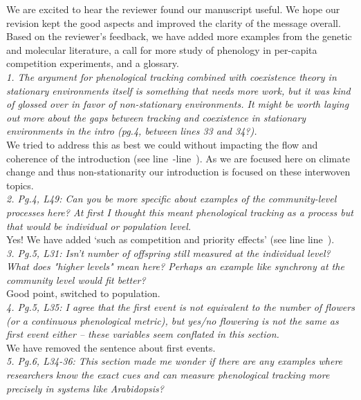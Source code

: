 \documentclass[11pt]{article}
\newcommand{\lr}[1]{line~\lineref{#1}}
\begin{document}
We are excited to hear the reviewer found our manuscript useful. We hope our revision kept the good aspects and improved the clarity of the message overall. Based on the reviewer's feedback, we have added more examples from the genetic and molecular literature, a call for more study of phenology in per-capita competition experiments, and a glossary.\\

\emph{1.      The argument for phenological tracking combined with coexistence theory in stationary
environments itself is something that needs more work, but it was kind of glossed over in
favor of non-stationary environments. It might be worth laying out more about the gaps
between tracking and coexistence in stationary environments in the intro (pg.4, between lines
33 and 34?).}\\

We tried to address this as best we could without impacting the flow and coherence of the introduction (see \lr{r2stat}-\lr{r2statend}). As we are focused here on climate change and thus non-stationarity our introduction is focused on these interwoven topics.\\

\emph{2.      Pg.4, L49: Can you be more specific about examples of the community-level processes
here? At first I thought this meant phenological tracking as a process but that would be
individual or population level.}\\

Yes! We have added `such as competition and priority effects' (see line \lr{r2example}).\\

\emph{3.      Pg.5, L31: Isn't number of offspring still measured at the individual level? What
does "higher levels" mean here? Perhaps an example like synchrony at the community level
would fit better?}\\

Good point, switched to population.\\

\emph{4.      Pg.5, L35: I agree that the first event is not equivalent to the number of flowers
(or a continuous phenological metric), but yes/no flowering is not the same as first event
either – these variables seem conflated in this section.}\\

We have removed the sentence about first events.\\

\emph{5.      Pg.6, L34-36: This section made me wonder if there are any examples where researchers
know the exact cues and can measure phenological tracking more precisely in systems like
Arabidopsis?}\\
\end{document}
